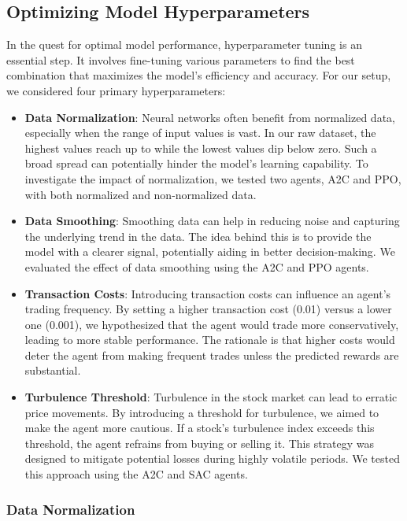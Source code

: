 \documentclass[12pt]{article}
\begin{document}
\subsection{Optimizing Model Hyperparameters}
In the quest for optimal model performance, hyperparameter tuning is an essential step. It involves fine-tuning various parameters to find the best combination that maximizes the model's efficiency and accuracy. For our setup, we considered four primary hyperparameters:
\begin{itemize}
    \item \textbf{Data Normalization}: Neural networks often benefit from normalized data, especially when the range of input values is vast. In our raw dataset, the highest values reach up to while the lowest values dip below zero. Such a broad spread can potentially hinder the model's learning capability. To investigate the impact of normalization, we tested two agents, A2C and PPO, with both normalized and non-normalized data.

    \item \textbf{Data Smoothing}: Smoothing data can help in reducing noise and capturing the underlying trend in the data. The idea behind this is to provide the model with a clearer signal, potentially aiding in better decision-making. We evaluated the effect of data smoothing using the A2C and PPO agents.

    \item \textbf{Transaction Costs}: Introducing transaction costs can influence an agent's trading frequency. By setting a higher transaction cost (0.01) versus a lower one (0.001), we hypothesized that the agent would trade more conservatively, leading to more stable performance. The rationale is that higher costs would deter the agent from making frequent trades unless the predicted rewards are substantial.

    \item \textbf{Turbulence Threshold}: Turbulence in the stock market can lead to erratic price movements. By introducing a threshold for turbulence, we aimed to make the agent more cautious. If a stock's turbulence index exceeds this threshold, the agent refrains from buying or selling it. This strategy was designed to mitigate potential losses during highly volatile periods. We tested this approach using the A2C and SAC agents.
\end{itemize}
\subsubsection{Data Normalization}
\end{document}
